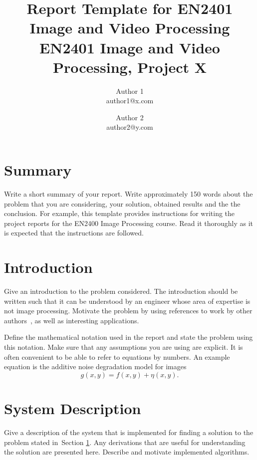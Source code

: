 \documentclass[a4paper]{article}
\begin{document}
\title{Report Template for EN2401 Image and Video Processing\\
\large{EN2401 Image and Video Processing, Project X}}
\author{Author 1\\ author1@x.com
  \and Author 2\\ author2@y.com}

\maketitle

\section*{Summary}
\label{sec:summary}

Write a short summary of your report. Write approximately 150 words about the
problem that you are considering, your solution, obtained results and the
the conclusion. For example, this template provides instructions for writing the
project reports for the EN2400 Image Processing course. Read it thoroughly as it
is expected that the instructions are followed.

\section{Introduction}
\label{sec:introduction}

Give an introduction to the problem considered. The introduction should be
written such that it can be understood by an engineer whose area of expertise is
not image processing. Motivate the problem by using references to work by other
authors~\cite{coursebook}, as well as interesting applications.

Define the mathematical notation used in the report and state the problem using
this notation. Make sure that any assumptions you are using are explicit. It is
often convenient to be able to refer to equations by numbers. An example
equation is the additive noise degradation model for images
\begin{equation}
  \label{eqn:model}
  g(x,y) = f(x,y) + \eta(x,y).
\end{equation}

\section{System Description}
\label{sec:system}
Give a description of the system that is implemented for finding a solution to
the problem stated in~Section \ref{sec:introduction}. Any derivations that are
useful for understanding the solution are presented here. Describe and motivate
implemented algorithms.
\end{document}
